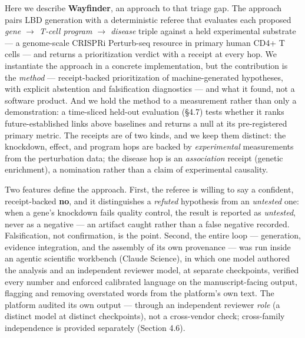 Here we describe \textbf{Wayfinder}, an approach to that triage gap. The approach pairs LBD generation with
a deterministic referee that evaluates each proposed \emph{gene $\rightarrow$ T-cell program $\rightarrow$ disease} triple against a
held experimental substrate --- a genome-scale CRISPRi Perturb-seq resource in primary human CD4+ T cells
\cite{zhu2025} --- and returns a prioritization verdict with a receipt at every hop. We instantiate the
approach in a concrete implementation, but the contribution is the \emph{method} --- receipt-backed
prioritization of machine-generated hypotheses, with explicit abstention and falsification diagnostics ---
and what it found, not a software product. And we hold the method to a measurement rather than only a
demonstration: a time-sliced held-out evaluation (\S{}4.7) tests whether it ranks future-established links above
baselines and returns a null at its pre-registered primary metric.
The receipts are of two kinds, and we keep them distinct: the knockdown, effect, and program hops are
backed by \emph{experimental} measurements from the perturbation data; the disease hop is an \emph{association}
receipt (genetic enrichment), a nomination rather than a claim of experimental causality.

Two features define the approach. First, the referee is willing to say a confident, receipt-backed \textbf{no},
and it distinguishes a \emph{refuted} hypothesis from an \emph{untested} one: when a gene's knockdown fails quality
control, the result is reported as \emph{untested}, never as a negative --- an artifact caught rather than a false
negative recorded. Falsification, not confirmation, is the point. Second, the entire loop --- generation,
evidence integration, and the assembly of its own provenance --- was run inside an agentic scientific workbench
(Claude Science), in which one model authored the analysis and an independent reviewer model, at separate
checkpoints, verified every number and enforced calibrated language on the manuscript-facing output,
flagging and removing overstated words from the platform's own text. The platform audited its own output ---
through an independent reviewer \emph{role} (a distinct model at distinct checkpoints), not a cross-vendor
check; cross-family independence is provided separately (Section 4.6).

